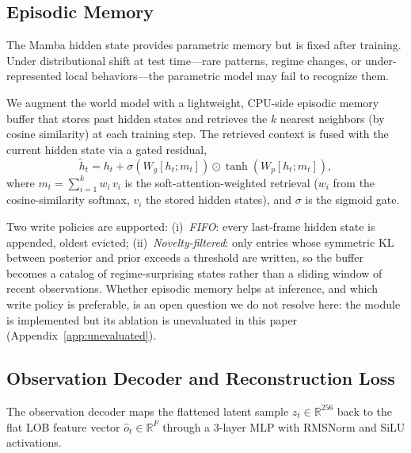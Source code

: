 \documentclass{article}
\newcommand{\R}{\mathbb{R}}
\newcommand{\zt}{z_t}
\begin{document}
\subsection{Episodic Memory}\label{sec:episodic_memory}

The Mamba hidden state provides parametric memory but is fixed after
training.  Under distributional shift at test time---rare patterns,
regime changes, or under-represented local behaviors---the parametric
model may fail to recognize them.

We augment the world model with a lightweight, CPU-side episodic memory
buffer that stores past hidden states and retrieves the $k$ nearest
neighbors (by cosine similarity) at each training step.  The retrieved
context is fused with the current hidden state via a gated residual,
\begin{equation}\label{eq:em_fusion}
  \tilde{h}_t = h_t + \sigma(W_g[h_t; m_t]) \odot \tanh(W_p[h_t; m_t]),
\end{equation}
where $m_t = \sum_{i=1}^{k} w_i\,v_i$ is the soft-attention-weighted
retrieval ($w_i$ from the cosine-similarity softmax, $v_i$ the stored
hidden states), and $\sigma$ is the sigmoid gate.

Two write policies are supported:
(i)~\emph{FIFO}: every last-frame hidden state is appended, oldest
evicted;
(ii)~\emph{Novelty-filtered}: only entries whose symmetric KL between
posterior and prior exceeds a threshold are written, so the buffer
becomes a catalog of regime-surprising states rather than a sliding
window of recent observations.  Whether episodic memory helps at
inference, and which write policy is preferable, is an open question we do
not resolve here: the module is implemented but its ablation is unevaluated
in this paper (Appendix~\ref{app:unevaluated}).

\subsection{Observation Decoder and Reconstruction Loss}\label{sec:decoder}

The observation decoder maps the flattened latent sample
$\zt \in \R^{256}$ back to the flat LOB feature vector
$\hat{o}_t \in \R^F$ through a 3-layer MLP with RMSNorm and SiLU
activations.
\end{document}
